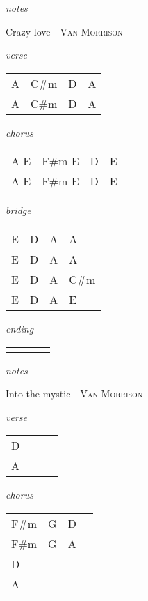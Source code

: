 \documentclass[12pt]{article}
\begin{document}
\textit{notes}

\newpage


{\Huge Crazy love} {\huge - \textsc{Van Morrison}}

\huge
\textit{verse}

\begin{tabular}{|P{1.25in}|P{1.25in}|P{1.25in}|P{1.25in}|}
  A  & C#m  &  D &  A \\
  A  & C#m  & D & A   \\
\end{tabular}

\textit{chorus}

\begin{tabular}{|P{1.25in}|P{1.25in}|P{1.25in}|P{1.25in}|}
  A  E  &  F#m  E&  D & E  \\
  A  E  &  F#m  E&  D & E  \\
\end{tabular}

\textit{bridge}

\begin{tabular}{|P{1.25in}|P{1.25in}|P{1.25in}|P{1.25in}|}
  E  &  D & A  &  A \\
  E  &  D & A  &  A \\
  E  &  D & A  &  C#m \\
  E  &  D & A  &  E \\
\end{tabular}

\textit{ending}

\begin{tabular}{|P{1.25in}|P{1.25in}|P{1.25in}|P{1.25in}|}
    &   &   &   \\
\end{tabular}

\textit{notes}

\newpage

{\Huge Into the mystic} {\huge - \textsc{Van Morrison}}

\huge
\textit{verse}

\begin{tabular}{|P{1.25in}|P{1.25in}|P{1.25in}|P{1.25in}|}
  D &   &   &   \\
  A &   &   &   \\
\end{tabular}

\textit{chorus}

\begin{tabular}{|P{1.25in}|P{1.25in}|P{1.25in}|P{1.25in}|}
  F#m  & G  &  D &   \\
  F#m  & G  &  A &   \\
  D  &  &  &  \\  
  A  &  &  &  \\
\end{tabular}
\end{document}
